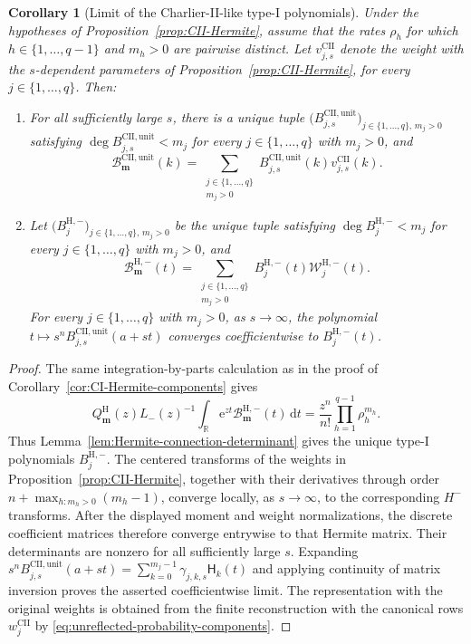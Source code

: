 \documentclass[10pt]{amsart}
\newcommand{\e}{\mathrm e}
\newcommand{\dd}{\,\mathrm d}
\newcommand{\mm}{\boldsymbol m}
\theoremstyle{plain}
\newtheorem{corollary}[theorem]{Corollary}
\theoremstyle{definition}
\theoremstyle{remark}
\begin{document}
\begin{corollary}[Limit of the Charlier-II-like type-I polynomials]
\label{cor:CII-Hermite-components}
Under the hypotheses of Proposition~\ref{prop:CII-Hermite}, assume that
the rates \(\rho_h\) for which \(h\in\{1,\ldots,q-1\}\) and \(m_h>0\)
are pairwise distinct.
Let \(v_{j,s}^{\mathrm{CII}}\) denote the weight with the \(s\)-dependent
parameters of Proposition~\ref{prop:CII-Hermite}, for every
\(j\in\{1,\ldots,q\}\). Then:
\begin{enumerate}[label=\textnormal{(\roman*)}]
\item For all sufficiently large \(s\), there is a unique tuple
\(\bigl(B_{j,s}^{\mathrm{CII,unit}}\bigr)_{
 j\in\{1,\ldots,q\},\,m_j>0}\) satisfying
\(\deg B_{j,s}^{\mathrm{CII,unit}}<m_j\) for every
\(j\in\{1,\ldots,q\}\) with \(m_j>0\), and
\[
 \mathcal B_{\mm}^{\mathrm{CII,unit}}(k)
 =\sum_{\substack{j\in\{1,\ldots,q\}\\m_j>0}}
 B_{j,s}^{\mathrm{CII,unit}}(k)
 v_{j,s}^{\mathrm{CII}}(k).
\]
\item Let \(\bigl(B_j^{\mathrm H,-}\bigr)_{
 j\in\{1,\ldots,q\},\,m_j>0}\) be the unique tuple satisfying
\(\deg B_j^{\mathrm H,-}<m_j\) for every
\(j\in\{1,\ldots,q\}\) with \(m_j>0\), and
\[
 \mathcal B_{\mm}^{\mathrm H,-}(t)
 =\sum_{\substack{j\in\{1,\ldots,q\}\\m_j>0}}
 B_j^{\mathrm H,-}(t)
 \mathcal W_j^{\mathrm H,-}(t).
\]
For every \(j\in\{1,\ldots,q\}\) with \(m_j>0\), as \(s\to\infty\), the polynomial
\(t\mapsto s^nB_{j,s}^{\mathrm{CII,unit}}(a+st)\) converges
coefficientwise to \(B_j^{\mathrm H,-}(t)\).
\end{enumerate}
\end{corollary}

\begin{proof}
The same integration-by-parts calculation as in the proof of
Corollary~\ref{cor:CI-Hermite-components} gives
\[
 Q_{\mm}^{\mathrm H}(z)L_-(z)^{-1}
 \int_{\mathbb R}\e^{zt}\mathcal B_{\mm}^{\mathrm H,-}(t)\dd t
 =\frac{z^n}{n!}\prod_{h=1}^{q-1}\rho_h^{m_h}.
\]
Thus Lemma~\ref{lem:Hermite-connection-determinant} gives the unique
type-I polynomials \(B_j^{\mathrm H,-}\). The centered transforms of the
weights in
Proposition~\ref{prop:CII-Hermite}, together with their derivatives
through order \(n+\max_{h:m_h>0}(m_h-1)\), converge locally, as
\(s\to\infty\), to the corresponding \(H^-\)
transforms. After the displayed moment and weight normalizations, the
discrete coefficient matrices therefore converge entrywise to that
Hermite matrix. Their determinants are nonzero for all sufficiently large
\(s\). Expanding
\(s^nB_{j,s}^{\mathrm{CII,unit}}(a+st)
=\sum_{k=0}^{m_j-1}\gamma_{j,k,s}\mathsf H_k(t)\) and applying continuity of
matrix inversion proves the asserted
coefficientwise limit. The representation with the original weights is
obtained from the finite reconstruction with the canonical rows
\(w_j^{\mathrm{CII}}\) by
\eqref{eq:unreflected-probability-components}.
\end{proof}
\end{document}
